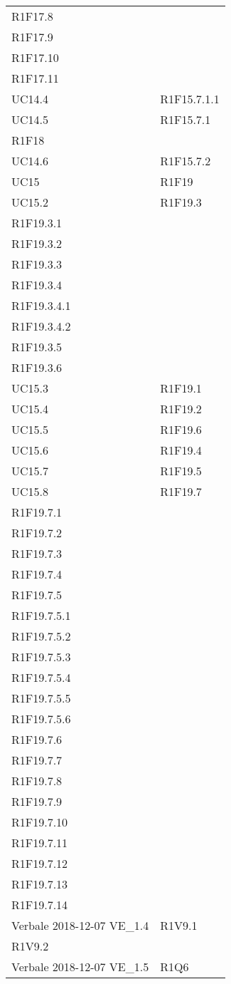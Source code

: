 \begin{longtable}{ >{\centering}p{}
			>{\centering}p{}}
		R1F17.8\\
		R1F17.9\\
		R1F17.10\\
		R1F17.11	\tabularnewline
		UC14.4	&	R1F15.7.1.1	\tabularnewline
		UC14.5	&	R1F15.7.1\\
		R1F18	\tabularnewline
		UC14.6	&	R1F15.7.2	\tabularnewline
		UC15	&	R1F19	\tabularnewline
		UC15.2	&	R1F19.3\\
		R1F19.3.1\\
		R1F19.3.2\\
		R1F19.3.3\\
		R1F19.3.4\\
		R1F19.3.4.1\\
		R1F19.3.4.2\\
		R1F19.3.5\\
		R1F19.3.6	\tabularnewline
		UC15.3	&	R1F19.1	\tabularnewline
		UC15.4	&	R1F19.2	\tabularnewline
		UC15.5	&	R1F19.6	\tabularnewline
		UC15.6	&	R1F19.4	\tabularnewline
		UC15.7	&	R1F19.5	\tabularnewline
		UC15.8	&	R1F19.7\\
		R1F19.7.1\\
		R1F19.7.2\\
		R1F19.7.3\\
		R1F19.7.4\\
		R1F19.7.5\\
		R1F19.7.5.1\\
		R1F19.7.5.2\\
		R1F19.7.5.3\\
		R1F19.7.5.4\\
		R1F19.7.5.5\\
		R1F19.7.5.6\\
		R1F19.7.6\\
		R1F19.7.7\\
		R1F19.7.8\\
		R1F19.7.9\\
		R1F19.7.10\\
		R1F19.7.11\\
		R1F19.7.12\\
		R1F19.7.13\\
		R1F19.7.14	\tabularnewline
		Verbale 2018-12-07 VE\_1.4	&	R1V9.1\\
		R1V9.2	\tabularnewline
		Verbale 2018-12-07 VE\_1.5	&	R1Q6	\tabularnewline
	
	\end{longtable}
